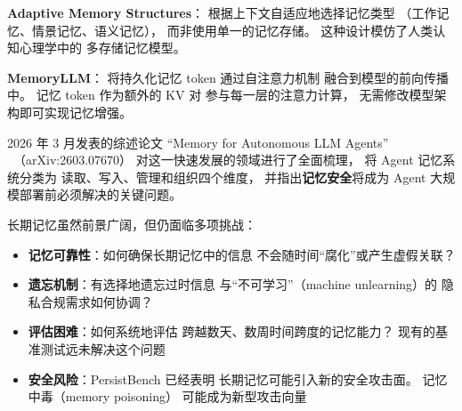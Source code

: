 \textbf{Adaptive Memory Structures}：
根据上下文自适应地选择记忆类型
（工作记忆、情景记忆、语义记忆），
而非使用单一的记忆存储。
这种设计模仿了人类认知心理学中的
多存储记忆模型。

\textbf{MemoryLLM}：
将持久化记忆 token 通过自注意力机制
融合到模型的前向传播中。
记忆 token 作为额外的 KV 对
参与每一层的注意力计算，
无需修改模型架构即可实现记忆增强。

2026 年 3 月发表的综述论文
``Memory for Autonomous LLM Agents''
~\cite{agentmemory2026}（arXiv:2603.07670）
对这一快速发展的领域进行了全面梳理，
将 Agent 记忆系统分类为
读取、写入、管理和组织四个维度，
并指出\textbf{记忆安全}将成为
Agent 大规模部署前必须解决的关键问题。

\begin{warnbox}[长期记忆的开放问题]
长期记忆虽然前景广阔，但仍面临多项挑战：
\begin{itemize}[noitemsep]
  \item \textbf{记忆可靠性}：如何确保长期记忆中的信息
        不会随时间``腐化''或产生虚假关联？
  \item \textbf{遗忘机制}：有选择地遗忘过时信息
        与``不可学习''（machine unlearning）的
        隐私合规需求如何协调？
  \item \textbf{评估困难}：如何系统地评估
        跨越数天、数周时间跨度的记忆能力？
        现有的基准测试远未解决这个问题
  \item \textbf{安全风险}：PersistBench 已经表明
        长期记忆可能引入新的安全攻击面。
        记忆中毒（memory poisoning）
        可能成为新型攻击向量
\end{itemize}
\end{warnbox}

